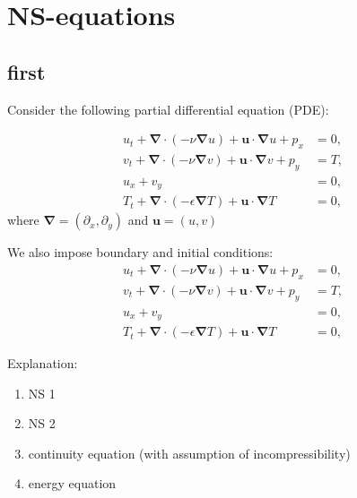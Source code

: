 \documentclass[11pt,a4paper]{report}
\begin{document}
\chapter{NS-equations}
\section{first}
Consider the following partial differential equation (PDE):

\begin{subequations}
\label{eq:NS_TP_2D}
\begin{align}
        u_{t}+\boldsymbol{\nabla}\cdot\left(-\nu\boldsymbol{\nabla}u \right)+\boldsymbol{u}\cdot\boldsymbol{\nabla}u + p_{x}&=0,         \label{eq:NS_TP_2D_1} \\
        v_{t}+\boldsymbol{\nabla}\cdot\left(-\nu\boldsymbol{\nabla}v \right)+\boldsymbol{u}\cdot\boldsymbol{\nabla}v + p_{y}&=T,         \label{eq:NS_TP_2D_2} \\
	u_{x} + v_{y} &=0,         															\label{eq:NS_TP_2D_3} \\
	T_{t}+\boldsymbol{\nabla}\cdot\left(-\epsilon\boldsymbol{\nabla}T \right)+\boldsymbol{u}\cdot\boldsymbol{\nabla}T &=0,        	\label{eq:NS_TP_2D_4} 	
\end{align}
\end{subequations}
where $\boldsymbol{\nabla}=(\partial_{x},\partial_{y})$ and $\boldsymbol{u}=(u,v)$

We also impose boundary and initial conditions:
\begin{subequations}
\label{eq:NS_TP_2D_conditions}
\begin{align}
        u_{t}+\boldsymbol{\nabla}\cdot\left(-\nu\boldsymbol{\nabla}u \right)+\boldsymbol{u}\cdot\boldsymbol{\nabla}u + p_{x}&=0,         \label{eq:NS_TP_2D_conditions_1} \\
        v_{t}+\boldsymbol{\nabla}\cdot\left(-\nu\boldsymbol{\nabla}v \right)+\boldsymbol{u}\cdot\boldsymbol{\nabla}v + p_{y}&=T,         \label{eq:NS_TP_2D_conditions_2} \\
	u_{x} + v_{y} &=0,         																			      \label{eq:NS_TP_2D_conditions_3} \\
	T_{t}+\boldsymbol{\nabla}\cdot\left(-\epsilon\boldsymbol{\nabla}T \right)+\boldsymbol{u}\cdot\boldsymbol{\nabla}T &=0,            \label{eq:NS_TP_2D_conditions_4} 	
\end{align}
\end{subequations}

Explanation:
\begin{enumerate}
\item NS 1
\item NS 2
\item continuity equation (with assumption of incompressibility)
\item energy equation
\end{enumerate}
\end{document}
